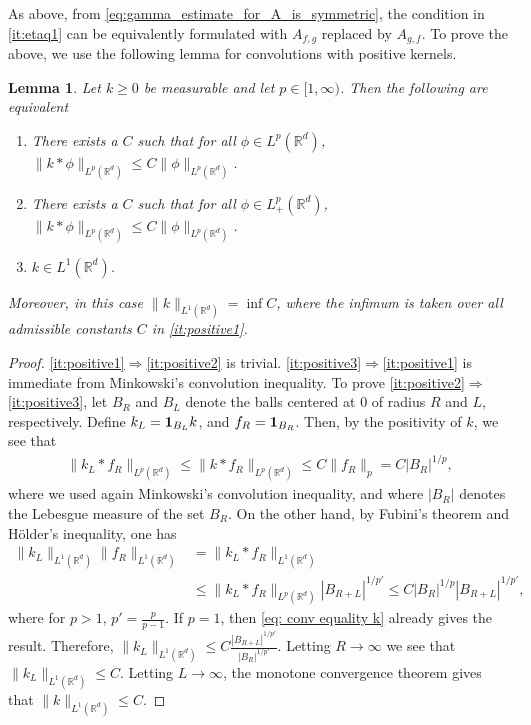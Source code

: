 \documentclass[reqno]{amsart}
\theoremstyle{plain}
\theoremstyle{remark}
\theoremstyle{plain}
\newtheorem{lemma}[theorem]{Lemma}
\numberwithin{equation}{section}
\def\R{{\mathbb R}}
\newcommand{\one}{{{\bf 1}}}
\newcommand{\1}{\one}
\begin{document}
As above, from \eqref{eq:gamma_estimate_for_A_is_symmetric}, the condition in \eqref{it:etaq1} can be equivalently formulated with $A_{f,g}$ replaced by $A_{g,f}$.
%
To prove the above, we use the following lemma for convolutions with positive kernels. 

\begin{lemma}
\label{lem:positive}
Let $k\geq 0$ be measurable and let $p\in [1,\infty)$. Then the following are equivalent 
\begin{enumerate}[{\rm(1)}]
\item\label{it:positive1} There exists a $C$ such that for all $\phi\in L^p(\R^d)$, $\|k*\phi\|_{L^p(\R^d)}\leq C\|\phi\|_{L^p(\R^d)}$.
\item\label{it:positive2} There exists a $C$ such that for all $\phi\in L^p_+(\R^d)$, $\|k*\phi\|_{L^p(\R^d)}\leq C\|\phi\|_{L^p(\R^d)}$.
\item\label{it:positive3} $k\in L^1(\R^d)$.
\end{enumerate}
Moreover, in this case $\|k\|_{L^1(\R^d)} = \inf C$, where the infimum is taken over all admissible constants $C$ in \eqref{it:positive1}. 
\end{lemma}
\begin{proof}
\eqref{it:positive1}$\Rightarrow$\eqref{it:positive2} is trivial. 
\eqref{it:positive3}$\Rightarrow$\eqref{it:positive1} is immediate from Minkowski's convolution inequality. 
To prove
\eqref{it:positive2}$\Rightarrow$\eqref{it:positive3}, let $B_R$ and $B_L$ denote the balls centered at $0$ of radius $R$ and $L$, respectively. Define $k_L = \one_{B_L} k$, and $f_R =  \one_{B_R}$. 
Then, by the positivity of $k$, we see that
\begin{align*}
\|k_L*f_R\|_{L^p(\R^d)} \leq \|k*f_R\|_{L^p(\R^d)} \leq C\|f_R\|_{p} = C |B_R|^{1/p},
\end{align*}
where we used again Minkowski's convolution inequality, and where $|B_R|$ denotes the Lebesgue measure of the set $B_R$.
On the other hand, by Fubini's theorem and H\"older's inequality, one has
\begin{align}
\label{eq: conv equality k}
  \|k_L\|_{L^1(\R^d)} \|f_R\|_{L^1(\R^d)} &= \|k_L*f_R\|_{L^1(\R^d)} 
  \\ & \leq \|k_L*f_R\|_{L^p(\R^d)} |B_{R+L}|^{1/p'}
   \leq C |B_R|^{1/p} | B_{R+L}|^{1/p'},
\end{align}
where for $p>1$, $p' = \tfrac{p}{p-1}$. If $p=1$, then \eqref{eq: conv equality k} already gives the result.
Therefore, $\|k_L\|_{L^1(\R^d)}\leq C \frac{|B_{R+L}|^{1/p'}}{|B_R|^{1/p'}}$.
Letting $R\to \infty$ we see that $\|k_L\|_{L^1(\R^d)}\leq C$. Letting $L\to \infty$, the monotone convergence theorem gives that $\|k\|_{L^1(\R^d)}\leq C$.
\end{proof}
\end{document}
